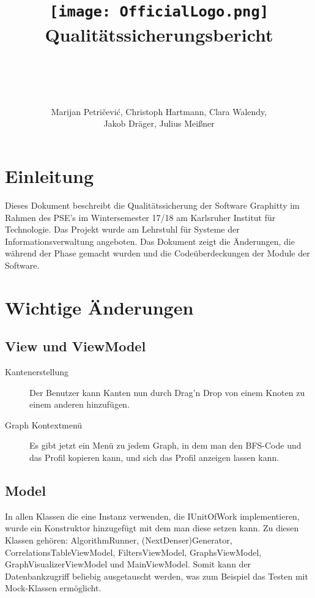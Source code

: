 \documentclass[13pt]{scrreprt}
\title{
	\texttt{[image: OfficialLogo.png]}
	\\
Qualitätssicherungsbericht
}
\author{\\ \\ \\ \\ Marijan Petričević, Christoph Hartmann, Clara Walendy,\\
	 Jakob Dräger, Julius Meißner}
\begin{document}
\maketitle


\tableofcontents


\chapter{Einleitung}
Dieses Dokument beschreibt die Qualitätssicherung der Software Graphitty im Rahmen des PSE's im Wintersemester 17/18 am Karlsruher Institut für Technologie. Das Projekt wurde am Lehrstuhl für Systeme der Informationsverwaltung angeboten.
Das Dokument zeigt die Änderungen, die während der Phase gemacht wurden und die Codeüberdeckungen der Module der Software.


\chapter{Wichtige Änderungen}
\section{View und ViewModel}
\begin{description}
\item[Kantenerstellung] Der Benutzer kann Kanten nun durch Drag'n Drop von einem Knoten zu einem anderen hinzufügen.
\item[Graph Kontextmenü] Es gibt jetzt ein Menü zu jedem Graph, in dem man den BFS-Code und das Profil kopieren kann, und sich das Profil anzeigen lassen kann.
\end{description}

\section{Model}
In allen Klassen die eine Instanz verwenden, die IUnitOfWork implementieren, wurde ein Konstruktor hinzugefügt mit dem man diese setzen kann. Zu diesen Klassen gehören: AlgorithmRunner, (NextDenser)Generator, CorrelationsTableViewModel, FiltersViewModel, GraphsViewModel, GraphVisualizerViewModel und MainViewModel. Somit kann der Datenbankzugriff beliebig ausgetauscht werden, was zum Beispiel das Testen mit Mock-Klassen ermöglicht.
\end{document}
